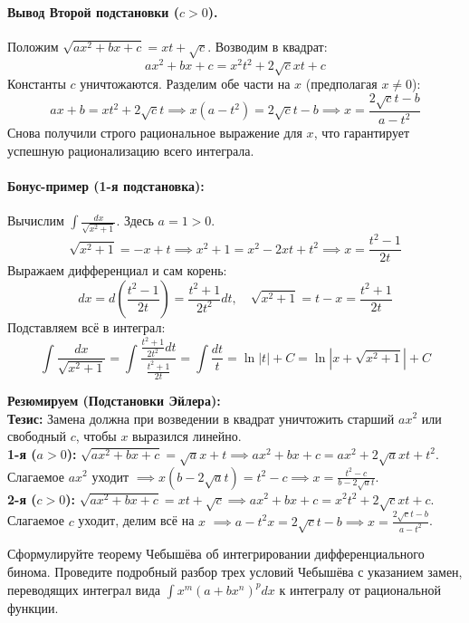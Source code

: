 \paragraph{Вывод Второй подстановки ($c > 0$).}
Положим $\sqrt{ax^2+bx+c} = xt + \sqrt{c}$. Возводим в квадрат:
$$ax^2 + bx + c = x^2t^2 + 2\sqrt{c}xt + c$$
Константы $c$ уничтожаются. Разделим обе части на $x$ (предполагая $x \neq 0$):
$$ax + b = xt^2 + 2\sqrt{c}t \implies x(a - t^2) = 2\sqrt{c}t - b \implies x = \frac{2\sqrt{c}t - b}{a - t^2}$$
Снова получили строго рациональное выражение для $x$, что гарантирует успешную рационализацию всего интеграла.

\paragraph{Бонус-пример (1-я подстановка):}
Вычислим $\int \frac{dx}{\sqrt{x^2+1}}$. Здесь $a=1>0$.
$$ \sqrt{x^2+1} = -x + t \implies x^2+1 = x^2 - 2xt + t^2 \implies x = \frac{t^2-1}{2t} $$
Выражаем дифференциал и сам корень:
$$ dx = d\left(\frac{t^2-1}{2t}\right) = \frac{t^2+1}{2t^2}dt, \quad \sqrt{x^2+1} = t - x = \frac{t^2+1}{2t} $$
Подставляем всё в интеграл:
$$ \int \frac{dx}{\sqrt{x^2+1}} = \int \frac{\frac{t^2+1}{2t^2} dt}{\frac{t^2+1}{2t}} = \int \frac{dt}{t} = \ln|t| + C = \ln\left|x + \sqrt{x^2+1}\right| + C $$


\begin{tcolorbox}[colback=gray!5, colframe=black, boxrule=0.5pt, arc=0pt]
\textbf{Резюмируем (Подстановки Эйлера):} \\
\textbf{Тезис:} Замена должна при возведении в квадрат уничтожить старший $ax^2$ или свободный $c$, чтобы $x$ выразился линейно. \\
\textbf{1-я ($a>0$):} $\sqrt{ax^2+bx+c} = \sqrt{a}x + t \implies ax^2+bx+c = ax^2 + 2\sqrt{a}xt + t^2$. Слагаемое $ax^2$ уходит $\implies x(b-2\sqrt{a}t) = t^2-c \implies x = \frac{t^2-c}{b-2\sqrt{a}t}$. \\
\textbf{2-я ($c>0$):} $\sqrt{ax^2+bx+c} = xt + \sqrt{c} \implies ax^2+bx+c = x^2t^2 + 2\sqrt{c}xt + c$. Слагаемое $c$ уходит, делим всё на $x$ $\implies a - t^2 x = 2\sqrt{c}t - b \implies x = \frac{2\sqrt{c}t-b}{a-t^2}$.
\end{tcolorbox}


{Сформулируйте теорему Чебышёва об интегрировании дифференциального бинома. Проведите подробный разбор трех условий Чебышёва с указанием замен, переводящих интеграл вида $\int x^{m}(a+bx^{n})^{p}dx$ к интегралу от рациональной функции.}

